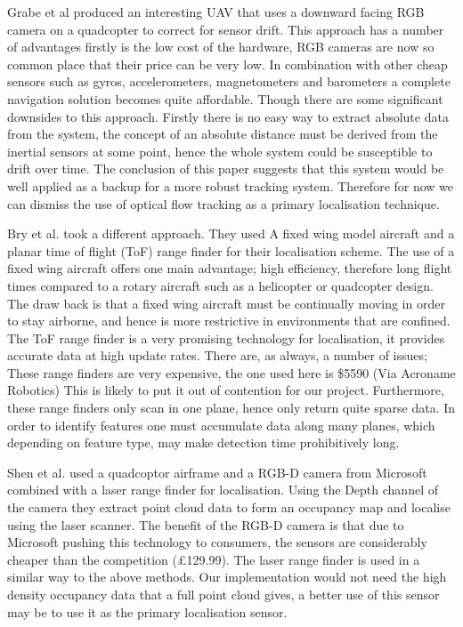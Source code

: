 \documentclass[]{article}
\begin{document}
{Grabe et al\cite{DBLP:conf/icra/GrabeBG12} produced an interesting \ac{UAV} that uses a downward facing \ac{RGB} camera on a quadcopter to correct for sensor drift. This approach has a number of advantages firstly is the low cost of the hardware, \ac{RGB} cameras are now so common place that their price can be very low. In combination with other cheap sensors such as gyros, accelerometers, magnetometers and barometers a complete navigation solution becomes quite affordable. Though there are some significant downsides to this approach. Firstly there is no easy way to extract absolute data from the system, the concept of an absolute distance must be derived from the inertial sensors at some point, hence the whole system could be susceptible to drift over time. The conclusion of this paper suggests that this system would be well applied as a backup for a more robust tracking system. Therefore for now we can dismiss the use of optical flow tracking as a primary localisation technique. 

Bry et al. \cite{Bry2012} took a different approach. They used A fixed wing model aircraft and a planar time of flight (ToF) range finder for their localisation scheme. The use of a fixed wing aircraft offers one main advantage; high efficiency, therefore long flight times compared to a rotary aircraft such as a helicopter or quadcopter design. The draw back is that a fixed wing aircraft must be continually moving in order to stay airborne, and hence is more restrictive in environments that are confined. The ToF range finder is a very promising technology for localisation, it provides accurate data at high update rates. There are, as always, a number of issues; These range finders are very expensive, the one used here is \$5590 (Via Acroname Robotics)%
This is likely to put it out of contention for our project. Furthermore, these range finders only scan in one plane, hence only return quite sparse data. In order to identify features one must accumulate data along many planes, which depending on feature type, may make detection time prohibitively long. 

Shen et al. \cite{Shen2012} used a quadcoptor airframe and a \ac{RGB-D} camera from Microsoft combined with a laser range finder for localisation. Using the Depth channel of the camera they extract point cloud data to form an occupancy map and localise using the laser scanner. The benefit of the \ac{RGB-D} camera is that due to Microsoft pushing this technology to consumers, the sensors are considerably cheaper than the competition (\pounds 129.99). The laser range finder is used in a similar way to the above methods. Our implementation would not need the high density occupancy data that a full point cloud gives, a better use of this sensor may be to use it as the primary localisation sensor.

}
\end{document}
